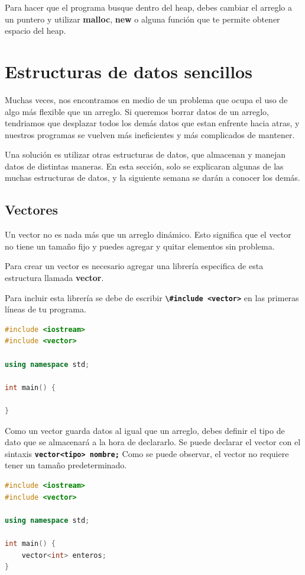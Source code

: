 \documentclass{article}
\begin{document}
Para hacer que el programa busque dentro del heap, debes cambiar el arreglo a un puntero y utilizar \textbf{malloc}, \textbf{new} o alguna función que te permite obtener espacio del heap.

\section{Estructuras de datos sencillos}

Muchas veces, nos encontramos en medio de un problema que ocupa el uso de algo más flexible que un arreglo. Si queremos borrar datos de un arreglo, tendriamos que desplazar todos los demás datos que estan enfrente hacia atras, y nuestros programas se vuelven más ineficientes y más complicados de mantener.

Una solución es utilizar otras estructuras de datos, que almacenan y manejan datos de distintas maneras. En esta sección, solo se explicaran algunas de las muchas estructuras de datos, y la siguiente semana se darán a conocer los demás.

\subsection{Vectores}

Un vector no es nada más que un arreglo dinámico. Esto significa que el vector no tiene un tamaño fijo y puedes agregar y quitar elementos sin problema.

Para crear un vector es necesario agregar una librería especifica de esta estructura llamada \textbf{vector}.

Para incluir esta librería se debe de escribir \textbf{\lstinline{\#include <vector>}} en las primeras líneas de tu programa.

\begin{lstlisting}[language=C++, caption=Vectores]
#include <iostream>
#include <vector>

using namespace std;

int main() {

}
\end{lstlisting}

Como un vector guarda datos al igual que un arreglo, debes definir el tipo de dato que se almacenará a la hora de declararlo. Se puede declarar el vector con el sintaxis \textbf{\lstinline{vector<tipo> nombre;}} Como se puede observar, el vector no requiere tener un tamaño predeterminado.

\begin{lstlisting}[language=C++, caption=Vectores]
#include <iostream>
#include <vector>

using namespace std;

int main() {
    vector<int> enteros;
}
\end{lstlisting}
\end{document}
